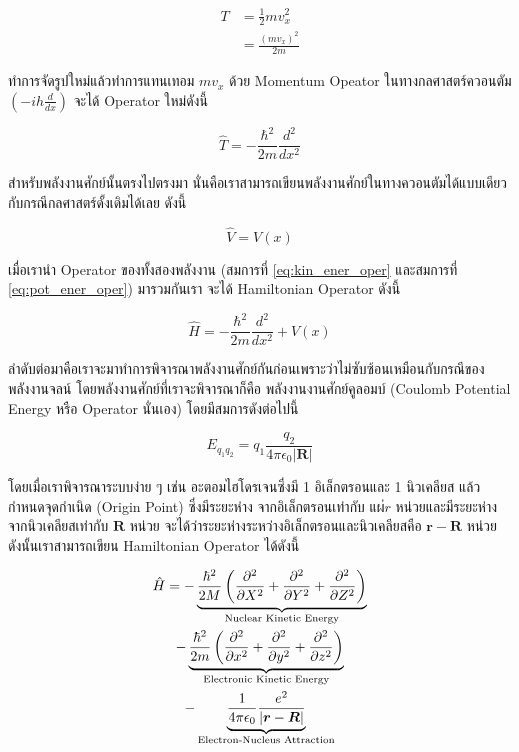\begin{align}
    T & = \frac{1}{2}mv^{2}_{x}   \\
      & = \frac{(mv_{x})^{2}}{2m}
\end{align}

\noindent ทำการจัดรูปใหม่แล้วทำการแทนเทอม $mv_{x}$ ด้วย Momentum Opeator ในทางกลศาสตร์ควอนตัม $(-ih\frac{d}{dx})$
จะได้ Operator ใหม่ดังนี้

\begin{equation}\label{eq:kin_ener_oper}
    \hat{T} = -\frac{\hbar^{2}}{2m}\frac{d^{2}}{dx^{2}}
\end{equation}

สำหรับพลังงานศักย์นั้นตรงไปตรงมา นั่นคือเราสามารถเขียนพลังงานศักย์ในทางควอนตัมได้แบบเดียวกับกรณีกลศาสตร์ดั้งเดิมได้เลย ดังนี้

\begin{equation}\label{eq:pot_ener_oper}
    \hat{V} = V(x)
\end{equation}

เมื่อเรานำ Operator ของทั้งสองพลังงาน (สมการที่ \eqref{eq:kin_ener_oper} และสมการที่ \eqref{eq:pot_ener_oper}) มารวมกันเรา%
จะได้ Hamiltonian Operator ดังนี้

\begin{equation}
    \hat{H} = -\frac{\hbar^{2}}{2m}\frac{d^{2}}{dx^{2}} + V(x)
\end{equation}

ลำดับต่อมาคือเราจะมาทำการพิจารณาพลังงานศักย์กันก่อนเพราะว่าไม่ซับซ้อนเหมือนกับกรณีของพลังงานจลน์ โดยพลังงานศักย์ที่เราจะพิจารณาก็คือ%
พลังงานงานศักย์คูลอมบ์ (Coulomb Potential Energy หรือ Operator นั่นเอง) โดยมีสมการดังต่อไปนี้

\begin{equation}
    E_{q_{1}q_{2}} = q_{1}\frac{q_{2}}{4\pi\epsilon_{0}|\bm{R}|}
\end{equation}

โดยเมื่อเราพิจารณาระบบง่าย ๆ เช่น อะตอมไฮโดรเจนซึ่งมี 1 อิเล็กตรอนและ 1 นิวเคลียส แล้วกำหนดจุดกำเนิด (Origin Point) ซึ่งมีระยะห่าง%
จากอิเล็กตรอนเท่ากับ $แผ่{r}$ หน่วยและมีระยะห่างจากนิวเคลียสเท่ากับ $\bm{R}$ หน่วย จะได้ว่าระยะห่างระหว่างอิเล็กตรอนและนิวเคลียสคือ
$\bm{r}-\bm{R}$ หน่วย ดังนั้นเราสามารถเขียน Hamiltonian Operator ได้ดังนี้

\begin{multline}\label{eq:hamil_hydrogen}
    \hat{H} = -\underbrace{\frac{\hbar^{2}}{2M} \left( \pdv[2]{X} + \pdv[2]{Y} + \pdv[2]{Z} \right)}_{%
        \text{Nuclear Kinetic Energy}}
    \\
    -\underbrace{\frac{\hbar^{2}}{2m} \left( \pdv[2]{x} + \pdv[2]{y} + \pdv[2]{z} \right)}_{%
        \text{Electronic Kinetic Energy}}
    \\
    -\underbrace{\frac{1}{4\pi\epsilon_{0}}\frac{e^{2}}{|\bm{r}-\bm{R}|}}_{%
        \text{Electron-Nucleus Attraction}}
\end{multline}


